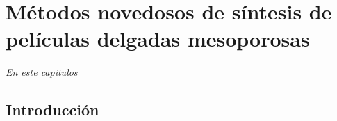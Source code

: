  \newcommand{\NoBiblioMeso}[1]{
 \ifthenelse{\equal{#1}{verdadero}}{}{}
 \NoBiblioMeso{verdadero}}

 
 \FormatoCapituloDosLineas
 
 \chapter{Métodos novedosos de síntesis de películas delgadas mesoporosas}
 \label{chap:Mesoporosos}

 \thispagestyle{empty}
	
 \noindent\textit{En este capitulos}
 
 
 \vfill
 \minitoc
 \newpage

\section{Introducción}

